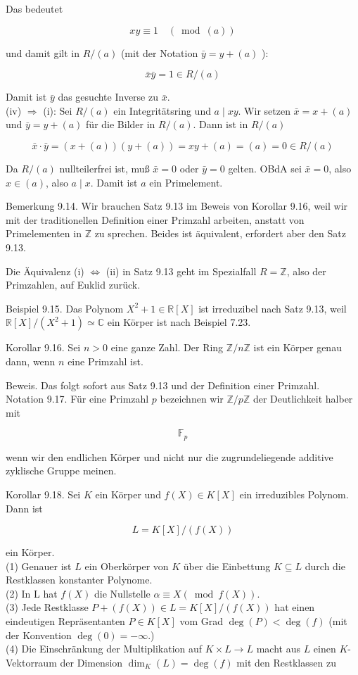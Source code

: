 \documentclass[10pt, letterpaper]{article}
\begin{document}
Das bedeutet

$$
x y \equiv 1 \quad(\bmod (a))
$$

und damit gilt in $R /(a)$ (mit der Notation $\bar{y}=y+(a)$ ):

$$
\bar{x} \bar{y}=1 \in R /(a)
$$

Damit ist $\bar{y}$ das gesuchte Inverse zu $\bar{x}$.\\
(iv) $\Longrightarrow$ (i): Sei $R /(a)$ ein Integritätsring und $a \mid x y$. Wir setzen $\bar{x}=x+(a)$ und $\bar{y}=y+(a)$ für die Bilder in $R /(a)$. Dann ist in $R /(a)$

$$
\bar{x} \cdot \bar{y}=(x+(a))(y+(a))=x y+(a)=(a)=0 \in R /(a)
$$

Da $R /(a)$ nullteilerfrei ist, muß $\bar{x}=0$ oder $\bar{y}=0$ gelten. OBdA sei $\bar{x}=0$, also $x \in(a)$, also $a \mid x$. Damit ist $a$ ein Primelement.

Bemerkung 9.14. Wir brauchen Satz 9.13 im Beweis von Korollar 9.16, weil wir mit der traditionellen Definition einer Primzahl arbeiten, anstatt von Primelementen in $\mathbb{Z}$ zu sprechen. Beides ist äquivalent, erfordert aber den Satz 9.13.

Die Äquivalenz (i) $\Longleftrightarrow$ (ii) in Satz 9.13 geht im Spezialfall $R=\mathbb{Z}$, also der Primzahlen, auf Euklid zurück.

Beispiel 9.15. Das Polynom $X^{2}+1 \in \mathbb{R}[X]$ ist irreduzibel nach Satz 9.13, weil $\mathbb{R}[X] /\left(X^{2}+1\right) \simeq \mathbb{C}$ ein Körper ist nach Beispiel 7.23.

Korollar 9.16. Sei $n>0$ eine ganze Zahl. Der Ring $\mathbb{Z} / n \mathbb{Z}$ ist ein Körper genau dann, wenn $n$ eine Primzahl ist.

Beweis. Das folgt sofort aus Satz 9.13 und der Definition einer Primzahl.\\
Notation 9.17. Für eine Primzahl $p$ bezeichnen wir $\mathbb{Z} / p \mathbb{Z}$ der Deutlichkeit halber mit

$$
\mathbb{F}_{p}
$$

wenn wir den endlichen Körper und nicht nur die zugrundeliegende additive zyklische Gruppe meinen.

Korollar 9.18. Sei $K$ ein Körper und $f(X) \in K[X]$ ein irreduzibles Polynom. Dann ist

$$
L=K[X] /(f(X))
$$

ein Körper.\\
(1) Genauer ist $L$ ein Oberkörper von $K$ über die Einbettung $K \subseteq L$ durch die Restklassen konstanter Polynome.\\
(2) In L hat $f(X)$ die Nullstelle $\alpha \equiv X(\bmod f(X))$.\\
(3) Jede Restklasse $P+(f(X)) \in L=K[X] /(f(X))$ hat einen eindeutigen Repräsentanten $P \in K[X]$ vom Grad $\operatorname{deg}(P)<\operatorname{deg}(f)$ (mit der Konvention $\operatorname{deg}(0)=-\infty$.)\\
(4) Die Einschränkung der Multiplikation auf $K \times L \rightarrow L$ macht aus $L$ einen $K$-Vektorraum der Dimension $\operatorname{dim}_{K}(L)=\operatorname{deg}(f)$ mit den Restklassen zu
\end{document}
